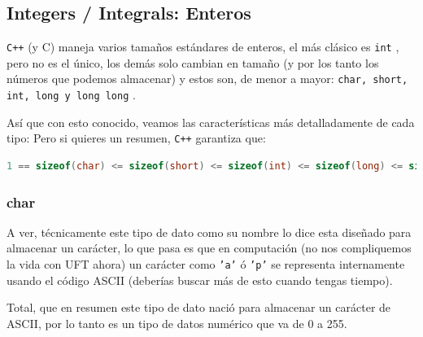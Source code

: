 \documentclass[12pt, fleqn]{report}                             %
\theoremstyle{break}                                            %
\newcommand{\textCode}[1]  { \texttt{#1} }                      %
\newcommand{\Cpp}{\ignorespaces\textCode{C++}}                  %
\begin{document}
            \subsection{Integers / Integrals: Enteros}

                \Cpp (y C) maneja varios tamaños estándares de enteros, el más clásico
                es \textCode{int}, pero no es el único, los demás solo cambian en tamaño
                (y por los tanto los números que podemos almacenar)
                y estos son, de menor a mayor: \textCode{char, short, int, long y long long}.

                Así que con esto conocido, veamos las características más detalladamente de cada tipo:
                Pero si quieres un resumen, \Cpp garantiza que:
                \begin{lstlisting}[language=C++, gobble=20]
                    1 == sizeof(char) <= sizeof(short) <= sizeof(int) <= sizeof(long) <= sizeof(long long);
                \end{lstlisting}


                \subsubsection{char}

                    A ver, técnicamente este tipo de dato como su nombre lo dice esta diseñado para almacenar
                    un carácter, lo que pasa es que en computación (no nos compliquemos la vida con UFT ahora)
                    un carácter como \textCode{'a'} ó \textCode{'p'} se representa internamente usando el código
                    ASCII (deberías buscar más de esto cuando tengas tiempo).
                    
                    Total, que en resumen este tipo de dato nació para almacenar un carácter de ASCII, 
                    por lo tanto es un tipo de datos numérico que va de 0 a 255.
\end{document}
